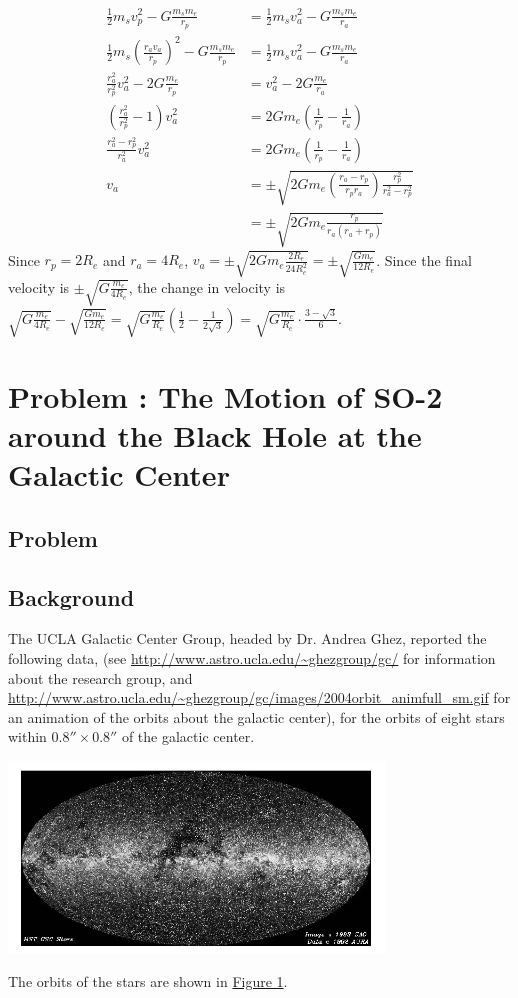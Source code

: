 \documentclass[solutions]{esg8012pset}
\begin{document}
\begin{enumerate}[(a)]
\begin{align*}
 \frac{1}{2} m_s v_p^2 - G\frac{m_s m_e}{r_p} & = \frac{1}{2} m_s v_a^2 - G\frac{m_s m_e}{r_a} \\
 \frac{1}{2} m_s \left(\frac{r_a v_a}{r_p}\right)^2 - G\frac{m_s m_e}{r_p} & = \frac{1}{2} m_s v_a^2 - G\frac{m_s m_e}{r_a} \\
 \frac{r_a^2}{r_p^2} v_a^2 - 2G\frac{m_e}{r_p} & = v_a^2 - 2G\frac{m_e}{r_a} \\
 \left(\frac{r_a^2}{r_p^2} - 1\right) v_a^2 & = 2Gm_e\left(\frac{1}{r_p} - \frac{1}{r_a}\right) \\
 \frac{r_a^2 - r_p^2}{r_a^2} v_a^2  & = 2Gm_e\left(\frac{1}{r_p} - \frac{1}{r_a}\right) \\
 v_a  & = \pm\sqrt{2Gm_e\left(\frac{r_a - r_p}{r_p r_a}\right)\frac{r_p^2}{r_a^2 - r_p^2}} \\
   & = \pm\sqrt{2Gm_e\frac{r_p}{r_a(r_a + r_p)}}
\end{align*}  Since $r_p = 2R_e$ and $r_a = 4R_e$, $v_a = \pm\sqrt{2Gm_e\frac{2R_e}{24R_e^2}} = \pm\sqrt{\frac{G m_e}{12R_e}}$.  Since the final velocity is $\pm \sqrt{G\frac{m_e}{4R_e}}$, the change in velocity is $\sqrt{G\frac{m_e}{4R_e}} - \sqrt{\frac{G m_e}{12R_e}} = \sqrt{G\frac{m_e}{R_e}}\left(\frac{1}{2} - \frac{1}{2\sqrt{3}}\right) = \sqrt{G\frac{m_e}{R_e}}\cdot \frac{3 - \sqrt{3}}{6}$.
\end{enumerate}
\section{Problem \thesection: The Motion of SO-2 around the Black Hole at the Galactic Center}
\subsection{Problem}
  \subsection{Background}
    The UCLA Galactic Center Group, headed by Dr. Andrea Ghez, reported the following data, (see \url{http://www.astro.ucla.edu/\~ghezgroup/gc/} for information about the research group, and \url{http://www.astro.ucla.edu/\~ghezgroup/gc/images/2004orbit_animfull_sm.gif} for an animation of the orbits about the galactic center), for the orbits of eight stars within $0.8'' \times 0.8''$ of the galactic center.
    \begin{center}\includegraphics[width=0.75\textwidth]{ps10_3}\end{center}
    The orbits of the stars are shown in \hyperref[fig:orbits]{Figure 1}.
\end{document}
